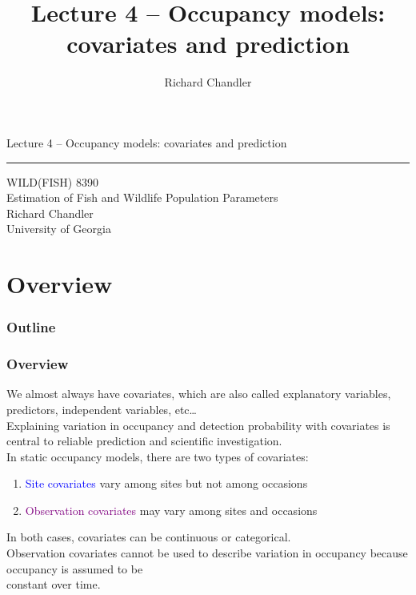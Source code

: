 \documentclass[color=usenames,dvipsnames]{beamer}\usepackage[]{graphicx}\usepackage[]{color}
\title{Lecture 4 -- Occupancy models: covariates and prediction }
\author{Richard Chandler}
\begin{document}
\begin{frame}[plain]
  \LARGE
  \centering
  {\huge Lecture 4 -- Occupancy models: covariates and prediction} \\
  {\color{default} \rule{\textwidth}{0.1pt}}
  \vfill
  \large
  WILD(FISH) 8390 \\
  Estimation of Fish and Wildlife Population Parameters \\
  \vfill
  \large
  Richard Chandler \\
  University of Georgia \\
\end{frame}






\section{Overview}



\begin{frame}[plain]
  \frametitle{Outline}
  \Large
\end{frame}



\begin{frame}
  \frametitle{Overview}
  We almost always have covariates, which are also called explanatory
  variables, predictors, independent variables, etc\dots \\
  \pause
  \vfill
  Explaining variation in occupancy and detection probability with
  covariates is central to reliable prediction and scientific
  investigation. \\  
  \pause
  \vfill
  In static occupancy models, there are two types of covariates:
  \begin{enumerate}
    \item \textcolor{blue}{Site covariates} vary among sites
      but not among occasions
    \item \textcolor{Purple}{Observation covariates} may vary among
      sites and occasions
  \end{enumerate}
  \pause
  \vfill
  In both cases, covariates can be continuous or categorical. \\
  \pause
  \vfill
  \centering
  \alert{Observation covariates cannot be used to describe variation
    in occupancy because occupancy is assumed to be \\ constant over
    time.} \\ 
\end{frame}
\end{document}
